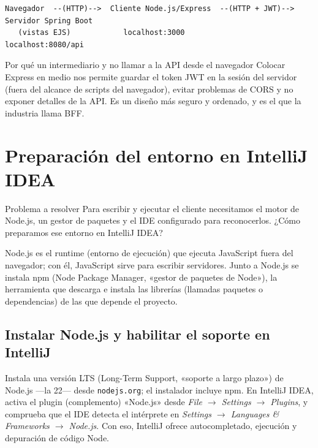 \documentclass[11pt]{article}
\begin{document}
\begin{cajacodigo}
\begin{lstlisting}[style=markup]
Navegador  --(HTTP)-->  Cliente Node.js/Express  --(HTTP + JWT)-->  Servidor Spring Boot
   (vistas EJS)            localhost:3000                              localhost:8080/api
\end{lstlisting}
\end{cajacodigo}
\vspace{2pt}
\begin{cajatip}{Por qué un intermediario y no llamar a la API desde el navegador}
Colocar Express en medio nos permite guardar el token JWT en la sesión del servidor (fuera del alcance de scripts del navegador), evitar problemas de CORS y no exponer detalles de la API. Es un diseño más seguro y ordenado, y es el que la industria llama BFF.\par
\end{cajatip}

\section{Preparación del entorno en IntelliJ IDEA}
\begin{cajaproblema}{Problema a resolver}
Para escribir y ejecutar el cliente necesitamos el motor de Node.js, un gestor de paquetes y el IDE configurado para reconocerlos. ¿Cómo preparamos ese entorno en IntelliJ IDEA?\par
\end{cajaproblema}
Node.js es el runtime (entorno de ejecución) que ejecuta JavaScript fuera del navegador; con él, JavaScript sirve para escribir servidores. Junto a Node.js se instala npm (Node Package Manager, «gestor de paquetes de Node»), la herramienta que descarga e instala las librerías (llamadas paquetes o dependencias) de las que depende el proyecto.

\subsection{Instalar Node.js y habilitar el soporte en IntelliJ}
Instala una versión LTS (Long-Term Support, «soporte a largo plazo») de Node.js —la 22— desde \texttt{nodejs.org}; el instalador incluye npm. En IntelliJ IDEA, activa el plugin (complemento) «Node.js» desde \emph{File $\rightarrow$ Settings $\rightarrow$ Plugins}, y comprueba que el IDE detecta el intérprete en \emph{Settings $\rightarrow$ Languages \& Frameworks $\rightarrow$ Node.js}. Con eso, IntelliJ ofrece autocompletado, ejecución y depuración de código Node.
\end{document}
